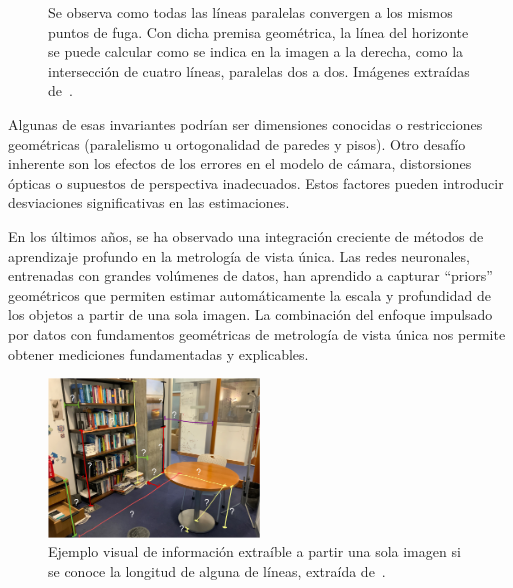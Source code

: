 \begin{figure}[!ht]
\begin{center}
\end{center}
\caption{Se observa como todas las líneas paralelas convergen a los mismos puntos de fuga.
Con dicha premisa geométrica, 
la línea del horizonte se puede calcular como se indica en la imagen a la derecha, como la intersección de cuatro líneas, paralelas dos a dos.
Imágenes extraídas de~\cite{VisionBookMIT}.
}
\label{fig:PalmaHorizon}
\end{figure}

Algunas de esas invariantes podrían ser dimensiones conocidas o restricciones geométricas (paralelismo u ortogonalidad de paredes y pisos).
Otro desafío inherente son los efectos de los errores en el modelo de cámara, distorsiones ópticas o supuestos de perspectiva inadecuados.
Estos factores pueden introducir desviaciones significativas en las estimaciones.
\par 
En los últimos años, se ha observado una integración creciente de métodos de aprendizaje profundo en la metrología de vista única. 
Las redes neuronales, entrenadas con grandes volúmenes de datos, han aprendido a capturar ``priors'' geométricos que permiten 
estimar automáticamente la escala y profundidad de los objetos a partir de una sola imagen. La combinación del enfoque 
impulsado por datos con fundamentos geométricas de metrología de vista única nos permite obtener mediciones fundamentadas y explicables.

\begin{figure}[!ht]
\begin{center}
    \includegraphics[width=0.5\textwidth]{imagenes/chapter2/office-measurements}
\end{center}
\caption{Ejemplo visual de información extraíble a partir una sola imagen si se conoce la longitud de alguna de líneas, extraída de~\cite{VisionBookMIT}.
}
\label{fig:PalmaHorizon}
\end{figure}

